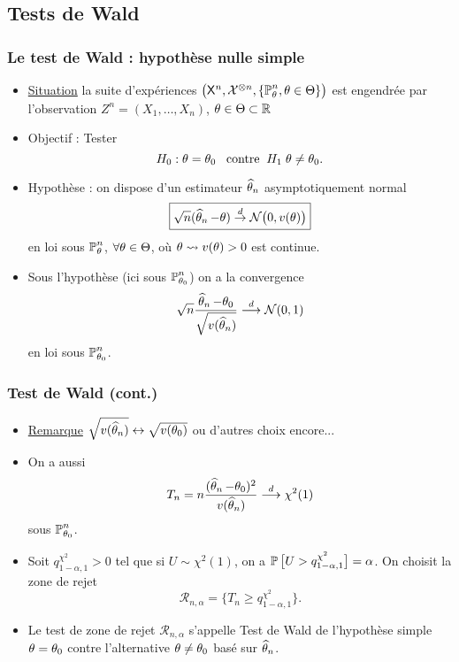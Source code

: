 \subsection{Tests de Wald}
\begin{frame}
\frametitle{Le test de Wald : hypothèse nulle simple}
\begin{itemize}
\item \underline{Situation} la suite d'expériences $\big(\mathsf{X}^n, \mathcal{X}^{\otimes n},\{\operatorname{{\mathbb P}}_\theta^n,\theta \in \Theta\}\big)$ est engendrée par l'observation $Z^n= (X_1,\dots,X_n)$, $\theta \in \Theta \subset \operatorname{{\mathbb R}}$
\item \alert{Objectif} : Tester
$$H_0:\theta = \theta_0\;\;\;\text{contre}\;\;H_1 \;\theta\neq \theta_0.$$
\item \alert{Hypothèse} : on dispose d'un estimateur $\operatorname{\widehat \theta_{\mathnormal{n}}}$ \alert{asymptotiquement normal}
$$\boxed{\sqrt{n}(\operatorname{\widehat \theta_{\mathnormal{n}}}-\theta)\stackrel{d}{\rightarrow}{\mathcal N}\big(0,v(\theta)\big)}$$
en loi sous $\operatorname{{\mathbb P}}_{\theta}^n$, $\forall \theta \in \Theta$, où $\theta \leadsto v(\theta) >0$ est continue.
\item Sous l'hypothèse (ici sous $\operatorname{{\mathbb P}}_{\theta_0}^n$) on a \alert{la convergence}
$$\sqrt{n}\frac{\operatorname{\widehat \theta_{\mathnormal{n}}}-\theta_0}{\sqrt{v(\operatorname{\widehat \theta_{\mathnormal{n}}})}}\stackrel{d}{\longrightarrow} {\mathcal N}(0,1)$$
\alert{en loi sous $\operatorname{{\mathbb P}}_{\theta_0}^n$}.
\end{itemize}
\end{frame}

\begin{frame}
\frametitle{Test de Wald (cont.)}
\begin{itemize}
\item \underline{Remarque} $\sqrt{v(\operatorname{\widehat \theta_{\mathnormal{n}}})} \leftrightarrow \sqrt{v(\theta_0)}$ ou d'autres choix encore...
\item On a aussi
$$T_n = n\frac{(\operatorname{\widehat \theta_{\mathnormal{n}}}-\theta_0)^2}{v(\operatorname{\widehat \theta_{\mathnormal{n}}})} \stackrel{d}{\longrightarrow} \chi^2(1)$$
sous $\operatorname{{\mathbb P}}_{\theta_0}^n$.
\item Soit $q_{1-\alpha,1}^{\chi^2} >0$ tel que si $U \sim \chi^2(1)$, on a $\operatorname{{\mathbb P}}\big[U > q_{1-\alpha,1}^{\chi^2}\big]=\alpha$. On \alert{choisit la zone de rejet}
$${\mathcal R}_{n,\alpha} = \big\{T_n\geq q_{1-\alpha,1}^{\chi^2}\big\}.$$
\item Le test de zone de rejet ${\mathcal R}_{n,\alpha}$ s'appelle \alert{Test de Wald de l'hypothèse simple $\theta=\theta_0$ contre l'alternative $\theta \neq \theta_0$ basé sur $\operatorname{\widehat \theta_{\mathnormal{n}}}$.}
\end{itemize}
\end{frame}

